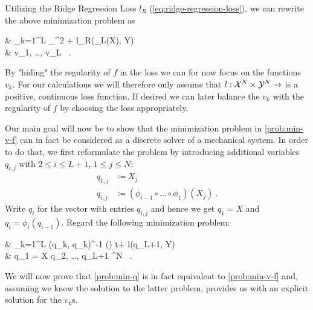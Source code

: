 Utilizing the Ridge Regression Loss $l_R$ (\cref{eq:ridge-regression-loss}), we can rewrite the above minimization problem as
\begin{problem}
	\begin{cases}
		 & \nu \cdot {} \sum_{k=1}^{L} _^2
		+ l_R(\Phi_L(X), Y) \\
		 & v_1, \ldots, v_L \in {}\ .
	\end{cases}
\end{problem}
By "hiding" the regularity of $f$ in the loss we can for now focus on the functions $v_k$.
For our calculations we will therefore only assume that $l: \mathcal{X}^N \times \mathcal{Y}^N \rightarrow$ is a positive, continuous loss function.
If desired we can later balance the $v_k$ with the regularity of $f$ by choosing the loss appropriately.

Our main goal will now be to show that the minimization problem in \cref{prob:min-v-f} can in fact be considered as a discrete solver of a mechanical system.
In order to do that, we first reformulate the problem by introducing additional variables $q_{i,j}$ with $2 \leq i \leq L+1$, $1 \leq j \leq N$:
\begin{align}
	q_{1, j} &\coloneqq X_j \, \\
	q_{i, j} &\coloneqq (\phi_{i-1} \circ \ldots \circ \phi_1) (X_j) \ .
\end{align}
Write $q_i$ for the vector with entries $q_{i,j}$ and hence we get $q_1 = X$ and $q_i = \phi_i(q_{i-1})$.
Regard the following minimization problem:
\begin{problem}
	\label{prob:min-q}
	\begin{cases}
		 & \nu \cdot {} \sum_{k=1}^{L}  \mathbf{\Gamma}(q_k, q_k)^{-1} \left(\right) \Delta t+ l(q_{L+1}, Y) \\
		 & q_1 = X  q_2, \ldots, q_{L+1} \in \cX^N \ .
	\end{cases}
\end{problem}
We will now prove that \cref{prob:min-q} is in fact equivalent to \cref{prob:min-v-f} and, assuming we know the solution to the latter problem, provides us with an explicit solution for the $v_k$s.

